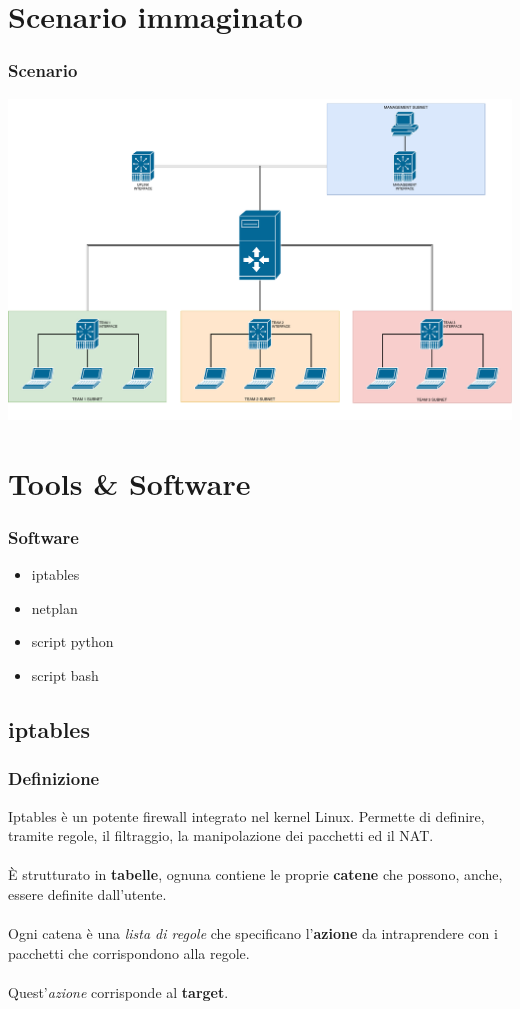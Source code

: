 \documentclass{beamer}
\begin{document}
\section{Scenario immaginato}

\begin{frame}
    \frametitle{Scenario}

    \includegraphics[width=\textwidth]{competition.pdf}

\end{frame}

\section{Tools \& Software}
\begin{frame}
    \frametitle{Software}
    \begin{itemize}
        \item <1-> iptables
        \item <2-> netplan
        \item <3-> script python
        \item <4-> script bash
    \end{itemize}
\end{frame}


\subsection*{iptables}
\begin{frame}
    \frametitle{Definizione}

    Iptables è un potente firewall integrato nel kernel Linux.
    Permette di definire, tramite regole, il filtraggio, la manipolazione dei pacchetti ed il NAT.
    \\~\\
    È strutturato in \textbf{tabelle}, ognuna contiene le proprie \textbf{catene} che possono, anche, essere definite dall'utente.
    \\~\\
    Ogni catena è una \textit{lista di regole} che specificano l'\textbf{azione} da intraprendere con i pacchetti che corrispondono alla regole.
    \\~\\
    Quest'\textit{azione} corrisponde al \textbf{target}.

\end{frame}
\end{document}
